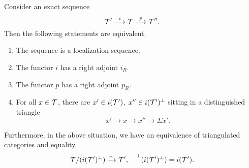 \begin{theorem}
	Consider an exact sequence
	\[ \mathcal{T}' \overset{i}{\longrightarrow} \mathcal{T} \overset{p}{\longrightarrow} \mathcal{T}''. \]
	Then the following statements are equivalent.
	\begin{enumerate}[label=(\arabic*)]
	\item The sequence is a localization sequence.
	\item The functor \(i\) has a right adjoint \(i_R\).
	\item The functor \(p\) has a right adjoint \(p_R\).
	\item For all \(x\in\mathcal{T}\), there are \(x'\in i(\mathcal{T}')\), \(x''\in i(\mathcal{T}')^\perp\) sitting in a distinguished triangle
	\[ x' \to x \to x'' \to \Sigma x'. \]
	\end{enumerate}
	Furthermore, in the above situation, we have an equivalence of triangulated categories and equality
	\[ \mathcal{T}/(i(\mathcal{T}')^\perp) \xrightarrow{\sim} \mathcal{T}',\quad \prescript{\perp}{}{(i(\ensuremath{\mathcal{T}}')^\perp)} = i(\mathcal{T}'). \]
\end{theorem}
